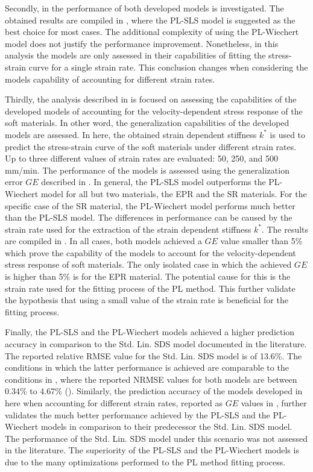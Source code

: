 Secondly, in  the performance of both developed models is investigated. The obtained results are compiled in , where the PL-SLS model is suggested as the best choice for most cases. The additional complexity of using the PL-Wiechert model does not justify the performance improvement. Nonetheless, in this analysis the models are only assessed in their capabilities of fitting the stress-strain curve for a single strain rate. This conclusion changes when considering the models capability of accounting for different strain rates.

Thirdly, the analysis described in  is focused on assessing the capabilities of the developed models of accounting for the velocity-dependent stress response of the soft materials. In other word, the generalization capabilities of the developed models are assessed. In here, the obtained strain dependent stiffness $k^*$ is used to predict the stress-strain curve of the soft materials under different strain rates. Up to three different values of strain rates are evaluated: 50, 250, and 500 mm/min. The performance of the models is assessed using the generalization error $GE$ described in . In general, the PL-SLS model outperforms the PL-Wiechert model for all but two materials, the EPR and the SR materials. For the specific case of the SR material, the PL-Wiechert model performs much better than the PL-SLS model. The differences in performance can be caused by the strain rate used for the extraction of the strain dependent stiffness $k^*$. The results are compiled in . In all cases, both models achieved a $GE$ value smaller than 5\% which prove the capability of the models to account for the velocity-dependent stress response of soft materials. The only isolated case in which the achieved $GE$ is higher than 5\% is for the EPR material. The potential cause for this is the strain rate used for the fitting process of the PL method. This further validate the hypothesis that using a small value of the strain rate is beneficial for the fitting process.

Finally, the PL-SLS and the PL-Wiechert models achieved a higher prediction accuracy in comparison to the Std. Lin. SDS model documented in the literature. The reported relative RMSE value for the Std. Lin. SDS model is of 13.6\%. The conditions in which the latter performance is achieved are comparable to the conditions in , where the reported NRMSE values for both models are between 0.34\% to 4.67\% (). Similarly, the prediction accuracy of the models developed in here when accounting for different strain rates, reported as $GE$ values in , further validates the much better performance achieved by the PL-SLS and the PL-Wiechert models in comparison to their predecessor the Std. Lin. SDS model. The performance of the Std. Lin. SDS model under this scenario was not assessed in the literature. The superiority of the PL-SLS and the PL-Wiechert models is due to the many optimizations performed to the PL method fitting process.

